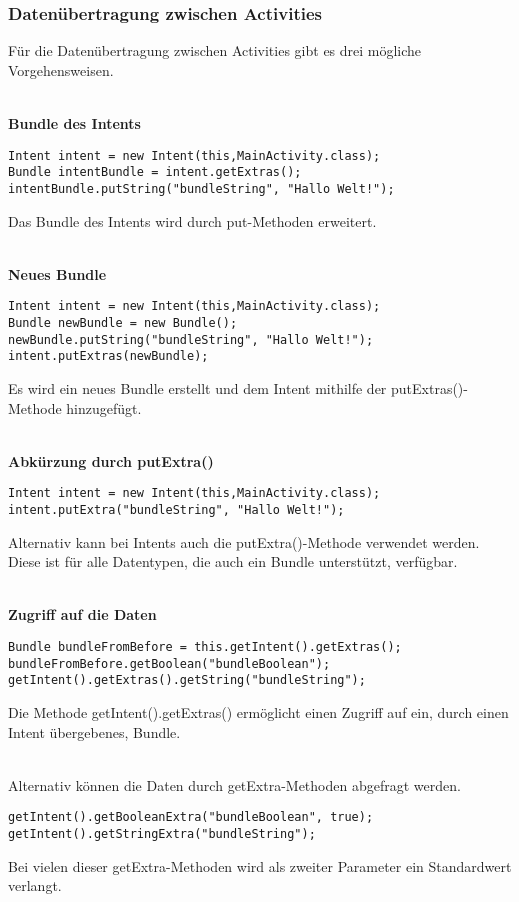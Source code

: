\documentclass[FIPLY_base.tex]{subfiles}
\begin{document}
\newpage
\subsubsection{Datenübertragung zwischen Activities}
Für die Datenübertragung zwischen Activities gibt es drei mögliche Vorgehensweisen.

\ \\
\textbf{Bundle des Intents}
\begin{lstlisting}
Intent intent = new Intent(this,MainActivity.class);
Bundle intentBundle = intent.getExtras();
intentBundle.putString("bundleString", "Hallo Welt!");
\end{lstlisting} 
Das Bundle des Intents wird durch put-Methoden erweitert.

\ \\
\textbf{Neues Bundle}
\begin{lstlisting}
Intent intent = new Intent(this,MainActivity.class);
Bundle newBundle = new Bundle();
newBundle.putString("bundleString", "Hallo Welt!");
intent.putExtras(newBundle);
\end{lstlisting} 
Es wird ein neues Bundle erstellt und dem Intent mithilfe der putExtras()-Methode hinzugefügt.

\ \\
\textbf{Abkürzung durch putExtra()}
\begin{lstlisting}
Intent intent = new Intent(this,MainActivity.class);
intent.putExtra("bundleString", "Hallo Welt!");
\end{lstlisting} 
Alternativ kann bei Intents auch die putExtra()-Methode verwendet werden. Diese ist für alle Datentypen, die auch ein Bundle unterstützt, verfügbar.

\ \\
\textbf{Zugriff auf die Daten}
\begin{lstlisting}
Bundle bundleFromBefore = this.getIntent().getExtras();
bundleFromBefore.getBoolean("bundleBoolean");
getIntent().getExtras().getString("bundleString");
\end{lstlisting}
Die Methode getIntent().getExtras() ermöglicht einen Zugriff auf ein, durch einen Intent übergebenes, Bundle.

\ \\
Alternativ können die Daten durch getExtra-Methoden abgefragt werden.
\begin{lstlisting}
getIntent().getBooleanExtra("bundleBoolean", true);
getIntent().getStringExtra("bundleString");
\end{lstlisting}
Bei vielen dieser getExtra-Methoden wird als zweiter Parameter ein Standardwert verlangt.
\end{document}
